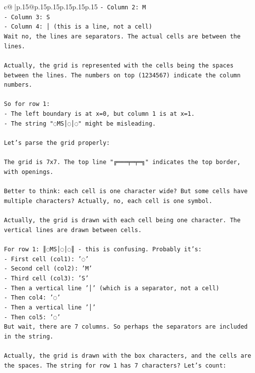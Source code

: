 \documentclass{article}
\begin{document}
{\begin{supertabular}{c@{$\;$}|p{.15\linewidth}@{}p{.15\linewidth}p{.15\linewidth}p{.15\linewidth}p{.15\linewidth}p{.15\linewidth}}
{{{\texttt{{-} Column 2: M} \\
\texttt{{-} Column 3: S} \\
\texttt{{-} Column 4: │ (this is a line, not a cell)} \\
\texttt{Wait no, the lines are separators. The actual cells are between the lines.} \\
\\ 
\texttt{Actually, the grid is represented with the cells being the spaces between the lines. The numbers on top (1234567) indicate the column numbers.} \\
\\ 
\texttt{So for row 1:} \\
\texttt{{-} The left boundary is at x=0, but column 1 is at x=1.} \\
\texttt{{-} The string "◌MS│◌│◌" might be misleading.} \\
\\ 
\texttt{Let's parse the grid properly:} \\
\\ 
\texttt{The grid is 7x7. The top line "╔═══╤═╤═╗" indicates the top border, with openings.} \\
\\ 
\texttt{Better to think: each cell is one character wide? But some cells have multiple characters? Actually, no, each cell is one symbol.} \\
\\ 
\texttt{Actually, the grid is drawn with each cell being one character. The vertical lines are drawn between cells.} \\
\\ 
\texttt{For row 1: ║◌MS│◌│◌║ {-} this is confusing. Probably it's:} \\
\texttt{{-} First cell (col1): '◌'} \\
\texttt{{-} Second cell (col2): 'M'} \\
\texttt{{-} Third cell (col3): 'S'} \\
\texttt{{-} Then a vertical line '│' (which is a separator, not a cell)} \\
\texttt{{-} Then col4: '◌'} \\
\texttt{{-} Then a vertical line '│'} \\
\texttt{{-} Then col5: '◌'} \\
\texttt{But wait, there are 7 columns. So perhaps the separators are included in the string.} \\
\\ 
\texttt{Actually, the grid is drawn with the box characters, and the cells are the spaces. The string for row 1 has 7 characters? Let's count:} \\
}}}
\end{supertabular}}
\end{document}
